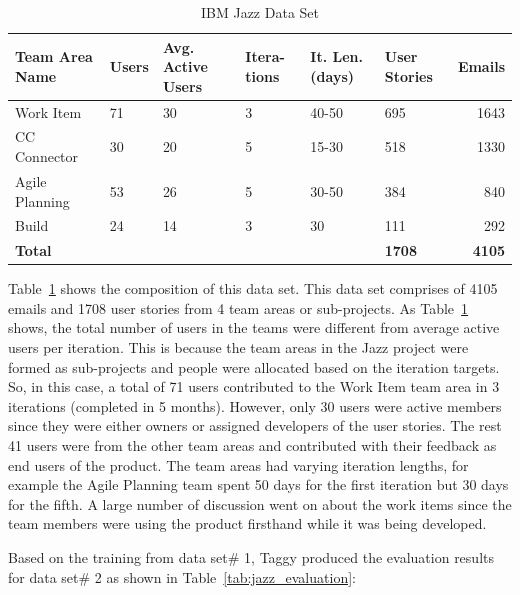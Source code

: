 \begin{table}[h!]
  \centering
  \caption{IBM Jazz Data Set}
	\label{tab:jazz}
    \begin{tabular}{|p{3cm}|p{1.5cm}|p{1.5cm}|p{1.3cm}|p{2cm}|p{2cm}|r|}
      \hline
      \textbf{Team Area Name} & \textbf{Users} & \textbf{Avg. Active Users} & \textbf{Itera- tions} & \textbf{It. Len. (days)}  & \textbf{User Stories} & \textbf{Emails}\\
      \hline                
      Work Item 			& 71 & 30		& 3 	& 40-50  		& 695 		& 1643 \\
      \hline
      CC Connector 	  & 30 & 20		& 5 	& 15-30 		& 518 	& 1330 \\
      \hline
      Agile Planning 	& 53 & 26 	& 5 	& 30-50 		& 384		& 840 \\
      \hline
      Build 					& 24 & 14		& 3 	& 30 				& 111 	& 292 \\
      \hline
      \textbf{Total} &  &  & &  & \textbf{1708} & \textbf{4105}\\
      \hline
    \end{tabular}
\end{table}

Table~\ref{tab:jazz} shows the composition of this data set. This data set comprises of 4105 emails and 1708 user stories from 4 team areas or sub-projects. As Table~\ref{tab:jazz} shows, the total number of users in the teams were different from average active users per iteration. This is because the team areas in the Jazz project were formed as sub-projects and people were allocated based on the iteration targets. So, in this case, a total of 71 users contributed to the Work Item team area in 3 iterations (completed in 5 months). However, only 30 users were active members since they were either owners or assigned developers of the user stories. The rest 41 users were from the other team areas and contributed with their feedback as end users of the product. The team areas had varying iteration lengths, for example the Agile Planning team spent 50 days for the first iteration but 30 days for the fifth. A large number of discussion went on about the work items since the team members were using the product firsthand while it was being developed.

Based on the training from data set\# 1, Taggy produced the evaluation results for data set\# 2 as shown in Table~\ref{tab:jazz_evaluation}:

